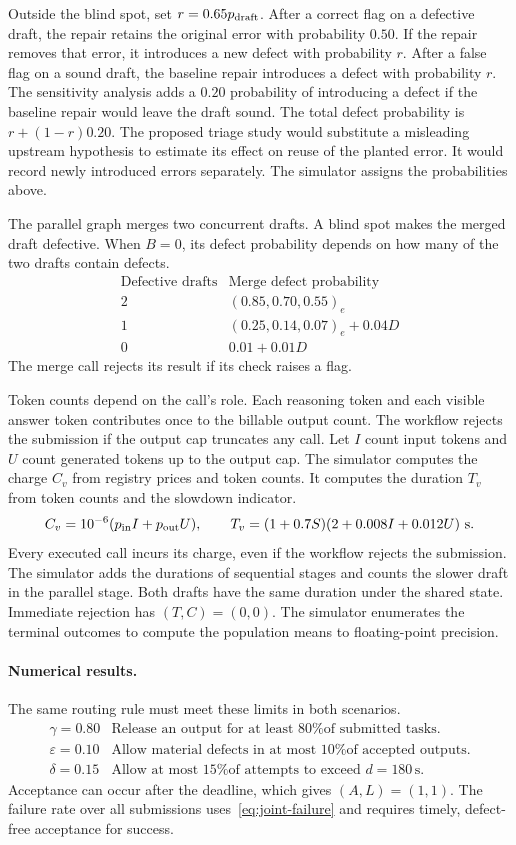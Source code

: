 \documentclass[11pt,reqno]{amsart}
\theoremstyle{definition}
\theoremstyle{remark}
\begin{document}
Outside the blind spot, set $r=0.65p_{\rm draft}$. After a correct flag on a defective draft, the repair retains the original error with probability $0.50$. If the repair removes that error, it introduces a new defect with probability $r$.
After a false flag on a sound draft, the baseline repair introduces a defect with probability $r$. The sensitivity analysis adds a $0.20$ probability of introducing a defect if the baseline repair would leave the draft sound. The total defect probability is $r+(1-r)0.20$.
The proposed triage study would substitute a misleading upstream hypothesis to estimate its effect on reuse of the planted error. It would record newly introduced errors separately. The simulator assigns the probabilities above.

The parallel graph merges two concurrent drafts.
A blind spot makes the merged draft defective. When $B=0$, its defect probability depends on how many of the two drafts contain defects.
\[
\begin{array}{cl}
\text{Defective drafts} & \text{Merge defect probability}\\[2pt]
2 & (0.85,0.70,0.55)_e\\
1 & (0.25,0.14,0.07)_e+0.04D\\
0 & 0.01+0.01D
\end{array}
\]
The merge call rejects its result if its check raises a flag.

Token counts depend on the call's role. Each reasoning token and each visible answer token contributes once to the billable output count. The workflow rejects the submission if the output cap truncates any call.
Let $I$ count input tokens and $U$ count generated tokens up to the output cap.
The simulator computes the charge $C_v$ from registry prices and token counts. It computes the duration $T_v$ from token counts and the slowdown indicator.
\[
C_v=10^{-6}(p_{\rm in}I+p_{\rm out}U),\qquad
T_v=(1+0.7S)(2+0.008I+0.012U)\ \mathrm{s}.
\]
Every executed call incurs its charge, even if the workflow rejects the submission.
The simulator adds the durations of sequential stages and counts the slower draft in the parallel stage. Both drafts have the same duration under the shared state.
Immediate rejection has $(T,C)=(0,0)$.
The simulator enumerates the terminal outcomes to compute the population means to floating-point precision.

\paragraph{Numerical results.}
The same routing rule must meet these limits in both scenarios.
\[
\begin{array}{ll}
\gamma=0.80 & \text{Release an output for at least 80\% of submitted tasks.}\\
\varepsilon=0.10 & \text{Allow material defects in at most 10\% of accepted outputs.}\\
\delta=0.15 & \text{Allow at most 15\% of attempts to exceed } d=180\,\mathrm{s}.
\end{array}
\]
Acceptance can occur after the deadline, which gives $(A,L)=(1,1)$. The failure rate over all submissions uses~\eqref{eq:joint-failure} and requires timely, defect-free acceptance for success.
\end{document}

